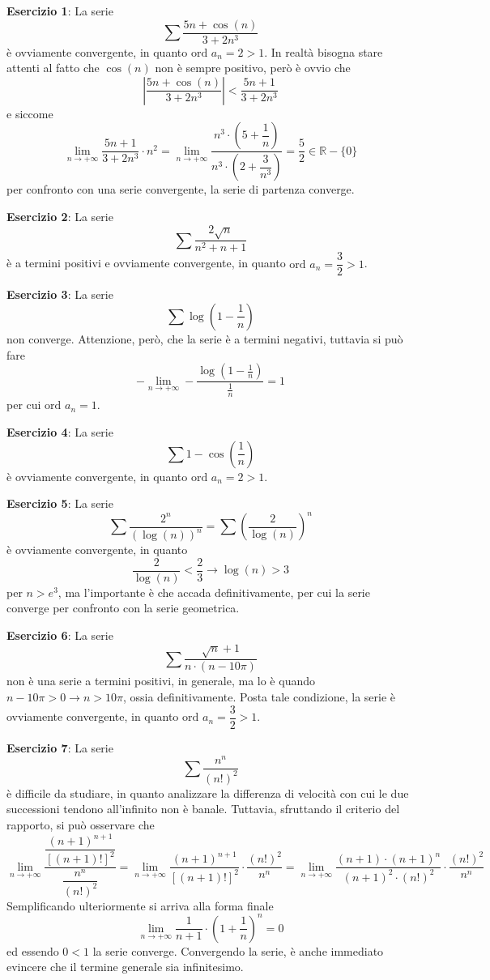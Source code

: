 \documentclass[a4paper]{extarticle}
\begin{document}
\vspace{1em}
\noindent
\textbf{Esercizio 1}: La serie
\[\sum \frac{5n + \cos(n)}{3 + 2n^3}\]
è ovviamente convergente, in quanto $\text{ord } a_n = 2 > 1$. In realtà bisogna stare attenti al fatto che $\cos(n)$ non è sempre positivo, però è ovvio che
\[\left \vert \frac{5n + \cos(n)}{3 + 2n^3} \right \vert < \frac{5n + 1}{3 + 2n^3}\]
e siccome
\[\lim_{n \to +\infty} \frac{5n + 1}{3 + 2n^3} \cdot n^2 = \lim_{n \to +\infty} \dfrac{n^3 \cdot \left(5 + \dfrac{1}{n} \right)}{n^3 \cdot \left(2 + \dfrac{3}{n^3} \right)} = \frac{5}{2} \in \mathbb{R} - \{0\}\]
per confronto con una serie convergente, la serie di partenza converge.

\vspace{1em}
\noindent
\textbf{Esercizio 2}: La serie
\[\sum \frac{2\sqrt{n}}{n^2+n+1}\]
è a termini positivi e ovviamente convergente, in quanto $\text{ord } a_n = \dfrac{3}{2} > 1$.

\vspace{1em}
\noindent
\textbf{Esercizio 3}: La serie
\[\sum \log \left(1-\frac{1}{n}\right)\]
non converge. Attenzione, però, che la serie è a termini negativi, tuttavia si può fare
\[-\lim_{n \to +\infty} -\frac{\log \left(1-\frac{1}{n}\right)}{\frac{1}{n}}=1\]
per cui $\text{ord } a_n = 1$.

\vspace{1em}
\noindent
\textbf{Esercizio 4}: La serie
\[\sum 1 - \cos \left(\frac{1}{n}\right)\]
è ovviamente convergente, in quanto $\text{ord } a_n = 2 > 1$.

\vspace{1em}
\noindent
\textbf{Esercizio 5}: La serie
\[\sum \frac{2^n}{(\log(n))^n} = \sum \left(\frac{2}{\log(n)}\right)^n\]
è ovviamente convergente, in quanto
\[\frac{2}{\log(n)} < \frac{2}{3} \rightarrow \log(n) > 3\]
per $n > e^3$, ma l'importante è che accada definitivamente, per cui la serie converge per confronto con la serie geometrica.

\vspace{1em}
\noindent
\textbf{Esercizio 6}: La serie
\[\sum \frac{\sqrt{n} + 1}{n \cdot \left(n-10\pi\right)}\]
non è una serie a termini positivi, in generale, ma lo è quando $n - 10\pi>0 \rightarrow n > 10 \pi$, ossia definitivamente. Posta tale condizione, la serie è ovviamente convergente, in quanto $\text{ord } a_n = \dfrac{3}{2} > 1$.

\vspace{1em}
\noindent
\textbf{Esercizio 7}: La serie
\[\sum \frac{n^n}{(n!)^2}\]
è difficile da studiare, in quanto analizzare la differenza di velocità con cui le due successioni tendono all'infinito non è banale. Tuttavia, sfruttando il criterio del rapporto, si può osservare che
\[\lim_{n \to +\infty} \dfrac{\dfrac{(n+1)^{n+1}}{\left[(n+1)!\right]^2}}{\dfrac{n^n}{(n!)^2}} = \lim_{n \to +\infty} \dfrac{(n+1)^{n+1}}{\left[(n+1)!\right]^2} \cdot \dfrac{(n!)^2}{n^n} = \lim_{n \to +\infty} \dfrac{(n+1) \cdot (n+1)^{n}}{(n+1)^2 \cdot (n!)^2} \cdot \dfrac{(n!)^2}{n^n}\]
Semplificando ulteriormente si arriva alla forma finale
\[\lim_{n \to +\infty} \frac{1}{n+1} \cdot \left(1+\frac{1}{n}\right)^n = 0\]
ed essendo $0 < 1$ la serie converge. Convergendo la serie, è anche immediato evincere che il termine generale sia infinitesimo.
\end{document}
